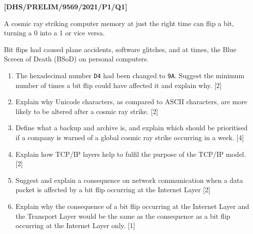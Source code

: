 \item \textbf{{[}DHS/PRELIM/9569/2021/P1/Q1{]} }

A cosmic ray striking computer memory at just the right time can flip
a bit, turning a 0 into a 1 or vice versa. 

Bit flips had caused plane accidents, software glitches, and at times,
the Blue Screen of Death (BSoD) on personal computers. 
\begin{enumerate}
\item The hexadecimal number \texttt{D4} had been changed to \texttt{9A}.
Suggest the minimum number of times a bit flip could have affected
it and explain why. \hfill{}{[}2{]}
\item Explain why Unicode characters, as compared to ASCII characters, are
more likely to be altered after a cosmic ray strike.\hfill{} {[}2{]}
\item Define what a backup and archive is, and explain which should be prioritised
if a company is warned of a global cosmic ray strike occurring in
a week. \hfill{}{[}4{]}
\item Explain how TCP/IP layers help to fulfil the purpose of the TCP/IP
model. \hfill{}{[}2{]}
\item Suggest and explain a consequence on network communication when a
data packet is affected by a bit flip occurring at the Internet Layer\hfill{}
{[}2{]}
\item Explain why the consequence of a bit flip occurring at the Internet
Layer and the Transport Layer would be the same as the consequence
as a bit flip occurring at the Internet Layer only. \hfill{}{[}1{]}
\end{enumerate}